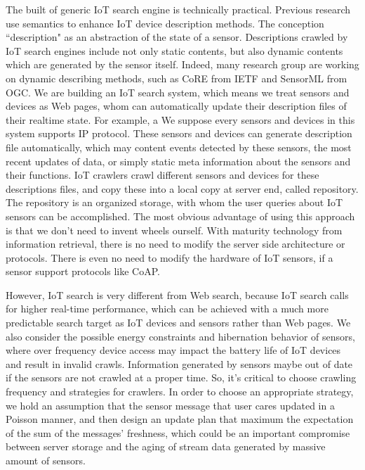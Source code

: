 \documentclass[conference]{IEEEtran}
\begin{document}
The built of generic IoT search engine is technically practical. Previous research use semantics\cite{Pfisterer2011} to enhance IoT device description methods. The conception ``description" as an abstraction of the state of a sensor.
Descriptions crawled by IoT search engines include not only static contents, but also dynamic contents which are generated by the sensor itself. Indeed, many research group are working on dynamic describing methods, such as CoRE\cite{CoREWorkingGroup2012} from IETF and SensorML\cite{botts2007opengis} from OGC. 
We are building an IoT search system, which means we treat sensors and devices as Web pages, whom can automatically update their description files of their realtime state. For example, a 
We suppose every sensors and devices in this system supports IP protocol. These sensors and devices can generate description file automatically, which may content events detected by these sensors, the most recent updates of data, or simply static meta information about the sensors and their functions. 
IoT crawlers crawl different sensors and devices for these descriptions files, and copy these into a local copy at server end, called repository. The repository is an organized storage, with whom the user queries about IoT sensors can be accomplished.
The most obvious advantage of using this approach is that we don't need to invent wheels ourself. With maturity technology from information retrieval, there is no need to modify the server side architecture or protocols. There is even no need to modify the hardware of IoT sensors, if a sensor support protocols like CoAP.


However, IoT search is very different from Web search, because IoT search calls for higher real-time performance, which can be achieved with a much more predictable search target as IoT devices and sensors rather than Web pages. We also consider the possible energy constraints and hibernation behavior of sensors, where over frequency device access may impact the battery life of IoT devices and result in invalid crawls.
Information generated by sensors maybe out of date if the sensors are not crawled at a proper time. So, it's critical to choose crawling frequency and strategies for crawlers. 
In order to choose an appropriate strategy, we hold an assumption that the sensor message that user cares updated in a Poisson manner, and then design an update plan that maximum the expectation of the sum of the messages' freshness, which could be an important compromise between server storage and the aging of stream data generated by massive amount of sensors.
\end{document}
